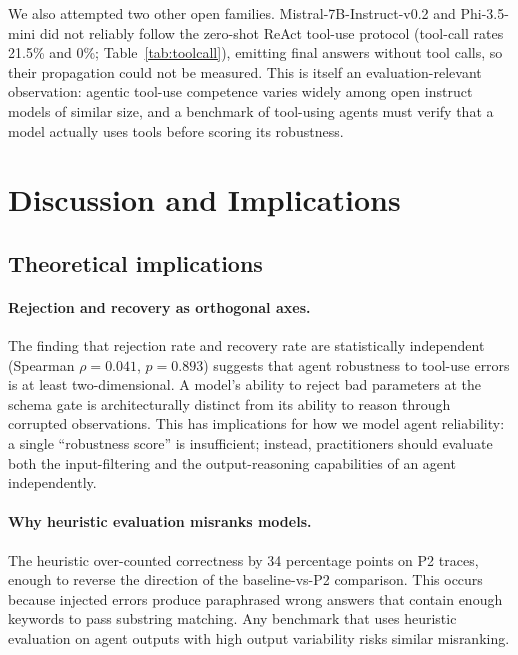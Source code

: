 \documentclass{article}
\begin{document}
We also attempted two other open families. Mistral-7B-Instruct-v0.2 and
Phi-3.5-mini did not reliably follow the zero-shot ReAct tool-use protocol
(tool-call rates 21.5\% and 0\%; Table~\ref{tab:toolcall}), emitting final
answers without tool calls, so their propagation could not be measured. This is
itself an evaluation-relevant observation: agentic tool-use competence varies
widely among open instruct models of similar size, and a benchmark of
tool-using agents must verify that a model actually uses tools before scoring
its robustness.


\section{Discussion and Implications}
\label{sec:discussion}

\subsection{Theoretical implications}

\paragraph{Rejection and recovery as orthogonal axes.}
The finding that rejection rate and recovery rate are statistically
independent (Spearman $\rho{=}0.041$, $p{=}0.893$) suggests that agent
robustness to tool-use errors is at least two-dimensional.
A model's ability to reject bad parameters at the schema gate is
architecturally distinct from its ability to reason through corrupted
observations.
This has implications for how we model agent reliability: a single
``robustness score'' is insufficient; instead, practitioners should
evaluate both the input-filtering and the output-reasoning capabilities
of an agent independently.

\paragraph{Why heuristic evaluation misranks models.}
The heuristic over-counted correctness by 34 percentage points on P2
traces, enough to reverse the direction of the baseline-vs-P2
comparison.
This occurs because injected errors produce paraphrased wrong answers
that contain enough keywords to pass substring matching.
Any benchmark that uses heuristic evaluation on agent outputs with
high output variability risks similar misranking.
\end{document}

